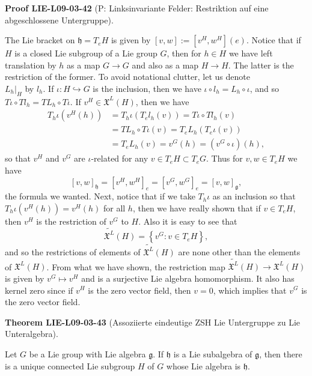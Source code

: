 \documentclass[10pt, letterpaper]{article}
\newcommand{\CustomHeading}[3]{%
  \par\medskip\noindent%
  \textbf{#1 #2} \textnormal{(#3)}.\enskip%
}
\newenvironment{THEO}[2]{\CustomHeading{Theorem}{#1}{#2}}{}
\newenvironment{PROOF}[2]{\CustomHeading{Proof}{#1}{#2}}{}
\begin{document}
\begin{PROOF}{LIE-L09-03-42}{P: Linksinvariante Felder: Restriktion auf eine abgeschlossene Untergruppe}
The Lie bracket on $\mathfrak{h}=T_{e} H$ is given by $[v, w]:=\left[v^{H}, w^{H}\right](e)$. Notice that if $H$ is a closed Lie subgroup of a Lie group $G$, then for $h \in H$ we have left translation by $h$ as a map $G \rightarrow G$ and also as a map $H \rightarrow H$. The latter is the restriction of the former. To avoid notational clutter, let us denote\\
$\left.L_{h}\right|_{H}$ by $l_{h}$. If $\iota: H \hookrightarrow G$ is the inclusion, then we have $\iota \circ l_{h}=L_{h} \circ \iota$, and so $T \iota \circ T l_{h}=T L_{h} \circ T \iota$. If $v^{H} \in \mathfrak{X}^{L}(H)$, then we have
$$
\begin{aligned}
T_{h} \iota\left(v^{H}(h)\right) & =T_{h} \iota\left(T_{e} l_{h}(v)\right)=T \iota \circ T l_{h}(v) \\
& =T L_{h} \circ T \iota(v)=T_{e} L_{h}\left(T_{e} \iota(v)\right) \\
& =T_{e} L_{h}(v)=v^{G}(h)=\left(v^{G} \circ \iota\right)(h),
\end{aligned}
$$
so that $v^{H}$ and $v^{G}$ are $\iota$-related for any $v \in T_{e} H \subset T_{e} G$. Thus for $v, w \in T_{e} H$ we have
$$
[v, w]_{\mathfrak{h}}=\left[v^{H}, w^{H}\right]_{e}=\left[v^{G}, w^{G}\right]_{e}=[v, w]_{\mathfrak{g}},
$$
the formula we wanted. Next, notice that if we take $T_{h} \iota$ as an inclusion so that $T_{h} \iota\left(v^{H}(h)\right)=v^{H}(h)$ for all $h$, then we have really shown that if $v \in T_{e} H$, then $v^{H}$ is the restriction of $v^{G}$ to $H$. Also it is easy to see that
$$
\widetilde{\mathfrak{X}^{L}}(H)=\left\{v^{G}: v \in T_{e} H\right\},
$$
and so the restrictions of elements of $\widetilde{\mathfrak{X}^{L}}(H)$ are none other than the elements of $\mathfrak{X}^{L}(H)$. From what we have shown, the restriction map $\widetilde{\mathfrak{X}^{L}}(H) \rightarrow \mathfrak{X}^{L}(H)$ is given by $v^{G} \longmapsto v^{H}$ and is a surjective Lie algebra homomorphism. It also has kernel zero since if $v^{H}$ is the zero vector field, then $v=0$, which implies that $v^{G}$ is the zero vector field.
\end{PROOF}

\begin{THEO}{LIE-L09-03-43}{Assoziierte eindeutige ZSH Lie Untergruppe zu Lie Unteralgebra}
Let $G$ be a Lie group with Lie algebra $\mathfrak{g}$. If $\mathfrak{h}$ is a Lie subalgebra of $\mathfrak{g}$, then there is a unique connected Lie subgroup $H$ of $G$ whose Lie algebra is $\mathfrak{h}$.
\end{THEO}
\end{document}
